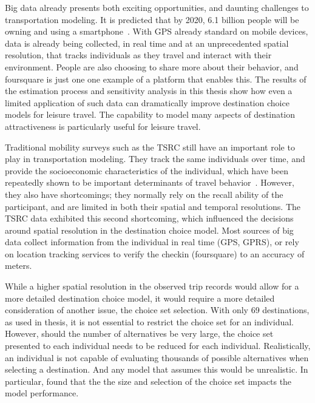 Big data already presents both exciting opportunities, and daunting challenges to transportation modeling. It is predicted that by 2020, 6.1 billion people will be owning and using a smartphone~\parencite{ericsson16}. With GPS already standard on mobile devices, data is already being collected, in real time and at an unprecedented spatial resolution, that tracks individuals as they travel and interact with their environment. People are also choosing to share more about their behavior, and foursquare is just one one example of a platform that enables this. The results of the estimation process and sensitivity analysis in this thesis show how even a limited application of such data can dramatically improve destination choice models for leisure travel. The capability to model many aspects of destination attractiveness is particularly useful for leisure travel.

Traditional mobility surveys such as the TSRC still have an important role to play in transportation modeling. They track the same individuals over time, and provide the socioeconomic characteristics of the individual, which have been repeatedly shown to be important determinants of travel behavior~\parencite{pas1984effect,hanson1982determinants}. However, they also have shortcomings; they normally rely on the recall ability of the participant, and are limited in both their spatial and temporal resolutions. The TSRC data exhibited this second shortcoming, which influenced the decisions around spatial resolution in the destination choice model. Most sources of big data collect information from the individual in real time (GPS, GPRS), or rely on location tracking services to verify the checkin (foursquare) to an accuracy of meters.

While a higher spatial resolution in the observed trip records would allow for a more detailed destination choice model, it would require a more detailed consideration of another issue, the choice set selection. With only 69 destinations, as used in thesis, it is not essential to restrict the choice set for an individual. However, should the number of alternatives be very large, the choice set presented to each individual needs to be reduced for each individual. Realistically, an individual is not capable of evaluating thousands of possible alternatives when selecting a destination. And any model that assumes this would be unrealistic. In particular, \textcite{AkivaLerman85} found that the the size and selection of the choice set impacts the model performance.

